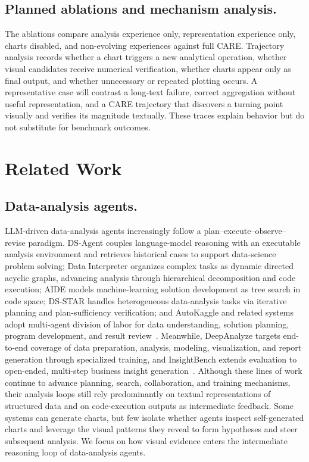 \documentclass{article}
\newcommand{\method}{\textsc{CARE}}
\begin{document}
\subsection{Planned ablations and mechanism analysis.}
The ablations compare analysis experience only, representation experience only, charts disabled, and non-evolving experiences against full \method{}.
Trajectory analysis records whether a chart triggers a new analytical operation, whether visual candidates receive numerical verification, whether charts appear only as final output, and whether unnecessary or repeated plotting occurs.
A representative case will contrast a long-text failure, correct aggregation without useful representation, and a \method{} trajectory that discovers a turning point visually and verifies its magnitude textually.
These traces explain behavior but do not substitute for benchmark outcomes.

\section{Related Work}
\label{sec:related}

\subsection{Data-analysis agents.}
LLM-driven data-analysis agents increasingly follow a plan--execute--observe--revise paradigm.
DS-Agent couples language-model reasoning with an executable analysis environment and retrieves historical cases to support data-science problem solving; Data Interpreter organizes complex tasks as dynamic directed acyclic graphs, advancing analysis through hierarchical decomposition and code execution; AIDE models machine-learning solution development as tree search in code space; DS-STAR handles heterogeneous data-analysis tasks via iterative planning and plan-sufficiency verification; and AutoKaggle and related systems adopt multi-agent division of labor for data understanding, solution planning, program development, and result review~\citep{guo2024dsagent,hong2025datainterpreter,jiang2025aide,nam2025dsstar,li2025autokaggle}.
Meanwhile, DeepAnalyze targets end-to-end coverage of data preparation, analysis, modeling, visualization, and report generation through specialized training, and InsightBench extends evaluation to open-ended, multi-step business insight generation~\citep{zhang2025deepanalyze,sahu2025insightbench}.
Although these lines of work continue to advance planning, search, collaboration, and training mechanisms, their analysis loops still rely predominantly on textual representations of structured data and on code-execution outputs as intermediate feedback.
Some systems can generate charts, but few isolate whether agents inspect self-generated charts and leverage the visual patterns they reveal to form hypotheses and steer subsequent analysis.
We focus on how visual evidence enters the intermediate reasoning loop of data-analysis agents.
\end{document}
